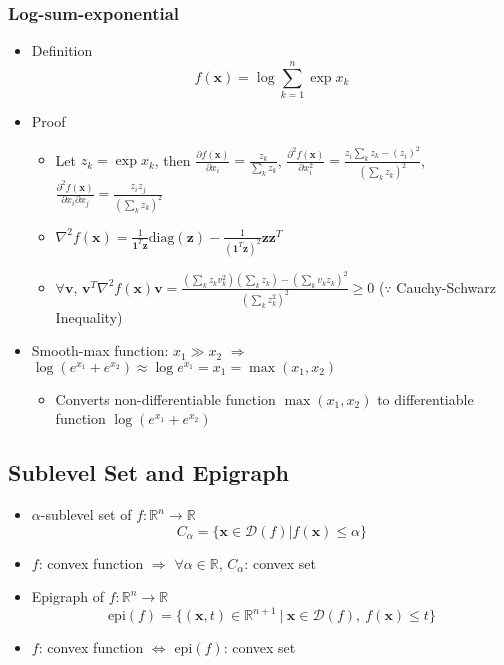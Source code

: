 \subsubsection*{Log-sum-exponential}
\begin{itemize}
    \item Definition
        $$ f(\mathbf{x}) = \log \sum_{k=1}^n \exp x_k $$
    \item Proof
    \begin{itemize}
        \item Let $z_k = \exp x_k$, then
            $\frac {\partial f(\mathbf{x})} {\partial x_i} = \frac {z_k} {\sum_k z_k}$,
            $\frac {\partial^2 f(\mathbf{x})} {\partial x_i^2} = \frac {z_i \sum_k z_k - (z_i)^2} {(\sum_k z_k)^2}$,
            $\frac {\partial^2 f(\mathbf{x})} {\partial x_i \partial x_j} = \frac {z_i z_j} {(\sum_k z_k)^2}$
        \item $\nabla^2 f(\mathbf{x}) = \frac 1 {\mathbf{1}^T \mathbf{z}} \mathrm{diag}(\mathbf{z}) - \frac 1 {(\mathbf{1}^T \mathbf{z})^2} \mathbf{z}\mathbf{z}^T$
        \item $\forall \mathbf{v}$, $\mathbf{v}^T \nabla^2 f(\mathbf{x}) \mathbf{v}
            = \frac {(\sum_k z_k v_k^2)(\sum_k z_k) - (\sum_k v_k z_k)^2} {(\sum_k z_k^2)^2} \geq 0$
            ($\because$ Cauchy-Schwarz Inequality)
    \end{itemize}
    \item Smooth-max function: $x_1 \gg x_2$ $\Rightarrow$ $\log \left( e^{x_1} + e^{x_2} \right) \approx \log e^{x_1} = x_1 = \max(x_1, x_2)$
    \begin{itemize}
        \item Converts non-differentiable function $\max(x_1, x_2)$ to differentiable function $\log \left( e^{x_1} + e^{x_2} \right)$
    \end{itemize}
\end{itemize}

\subsection{Sublevel Set and Epigraph}
\begin{itemize}
    \item $\alpha$-sublevel set of $f:\mathbb{R}^n \rightarrow \mathbb{R}$
        $$ C_{\alpha} = \{ \mathbf{x} \in \mathcal{D}(f) | f(\mathbf{x}) \leq \alpha \} $$
    \item $f$: convex function $\Rightarrow$ $\forall \alpha \in \mathbb{R}$, $C_\alpha$: convex set
    \item Epigraph of $f:\mathbb{R}^n \rightarrow \mathbb{R}$
        $$ \mathrm{epi}(f) = \{ (\mathbf{x},t) \in \mathbb{R}^{n+1}~|~\mathbf{x} \in \mathcal{D}(f),~f(\mathbf{x}) \leq t \} $$
    \item $f$: convex function $\Leftrightarrow$ $\mathrm{epi}(f)$: convex set
\end{itemize}

